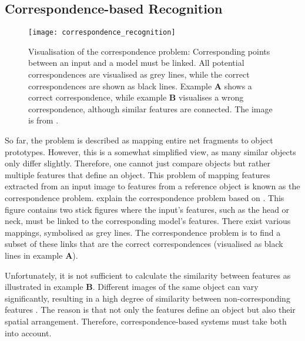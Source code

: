 \subsection{Correspondence-based Recognition}
\begin{figure}[h]
    \centering
    \texttt{[image: correspondence\_recognition]}
    \caption[The visual correspondence problem]{Visualisation of the correspondence problem: Corresponding points between an input and a model must be linked. All potential correspondences are visualised as grey lines, while the correct correspondences are shown as black lines. Example $\boldsymbol{A}$ shows a correct correspondence, while example $\boldsymbol{B}$ visualises a wrong correspondence, although similar features are connected. The image is from \cite{wolfrum_recurrent_2008}.}
\end{figure}

So far, the problem is described as mapping entire net fragments to object prototypes.
However, this is a somewhat simplified view, as many similar objects only differ slightly.
Therefore, one cannot just compare objects but rather multiple features that define an object.
This problem of mapping features extracted from an input image to features from a reference object is known as the correspondence problem.
 explain the correspondence problem based on . This figure contains two stick figures where the input's features, such as the head or neck, must be linked to the corresponding model's features.
There exist various mappings, symbolised as grey lines.
The correspondence problem is to find a subset of these links that are the correct correspondences (visualised as black lines in example $\boldsymbol{A}$). 

Unfortunately, it is not sufficient to calculate the similarity between features as illustrated in 
 example $\boldsymbol{B}$. Different images of the same object can vary significantly, resulting in a high degree of similarity between non-corresponding features . The reason is that not only the features define an object but also their spatial arrangement. Therefore, correspondence-based systems must take both into account.

